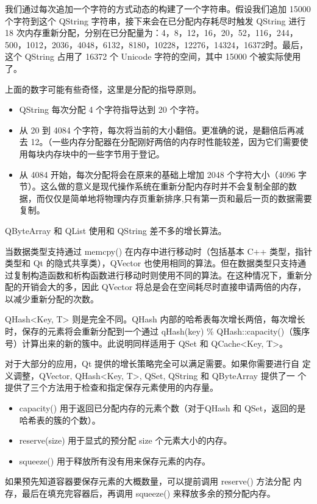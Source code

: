 我们通过每次追加一个字符的方式动态的构建了一个字符串。假设我们追加 15000 个字符到这个 QString 字符串，接下来会在已分配内存耗尽时触发 QString 进行 18 次内存重新分配，分别在已分配量为：4，8，12，16，20，52，116，244，500，1012，2036，4048，6132，8180，10228，12276，14324，16372时。最后，这个 QString 占用了 16372 个 Unicode 字符的空间，其中 15000 个被实际使用了。

上面的数字可能有些奇怪，这里是分配的指导原则。

\begin{itemize}
\item QString 每次分配 4 个字符指导达到 20 个字符。
\item 从 20 到 4084 个字符，每次将当前的大小翻倍。更准确的说，是翻倍后再减去 12。（一些内存分配器在分配刚好两倍的内存时性能较差，因为它们需要使用每块内存块中的一些字节用于登记。
\item 从 4084 开始，每次分配将会在原来的基础上增加 2048 个字符大小（4096 字节）。这么做的意义是现代操作系统在重新分配内存时并不会复制全部的数据，而仅仅是简单地将物理内存页重新排序,只有第一页和最后一页的数据需要复制。
\end{itemize}

QByteArray 和 QList 使用和 QString 差不多的增长算法。

当数据类型支持通过 memcpy() 在内存中进行移动时（包括基本 C++ 类型，指针类型和 Qt 的隐式共享类），QVector 也使用相同的算法。但在数据类型只支持通过复制构造函数和析构函数进行移动时则使用不同的算法。在这种情况下，重新分配的开销会大的多，因此 QVector 将总是会在空间耗尽时直接申请两倍的内存，以减少重新分配的次数。

QHash<Key, T> 则是完全不同。QHash 内部的哈希表每次增长两倍，每次增长时，保存的元素将会重新分配到一个通过 qHash(key) \% QHash::capacity()（簇序号）计算出来的新的簇中。此说明同样适用于 QSet 和 QCache<Key, T>。

对于大部分的应用，Qt 提供的增长策略完全可以满足需要。如果你需要进行自
定义调整，QVector, QHash<Key, T>, QSet, QString 和 QByteArray 提供了一
个提供了三个方法用于检查和指定保存元素使用的内存量。

\begin{itemize}
\item capacity() 用于返回已分配内存的元素个数（对于QHash 和 QSet，返回的是哈希表的簇的个数）。
\item reserve(size) 用于显式的预分配 size 个元素大小的内存。
\item squeeze() 用于释放所有没有用来保存元素的内存。
\end{itemize}

如果预先知道容器要保存元素的大概数量，可以提前调用 reserve() 方法分配
内存，最后在填充完容器后，再调用 squeeze() 来释放多余的预分配内存。


